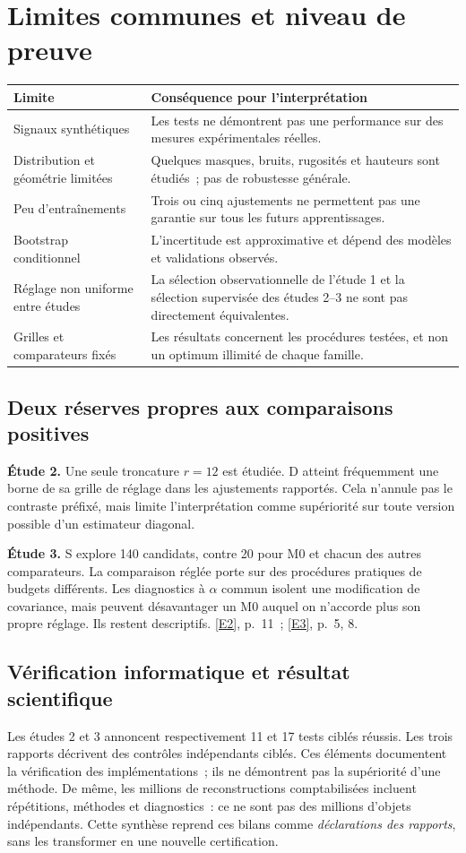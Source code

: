 \documentclass[11pt,a4paper]{article}
\DeclareRobustCommand{\eref}[1]{\hyperlink{ref#1}{[#1]}}
\begin{document}
\newpage
\section{Limites communes et niveau de preuve}
\begin{tabularx}{\textwidth}{@{}p{}Y@{}}
\toprule
\textbf{Limite} & \textbf{Conséquence pour l'interprétation}\\
\midrule
Signaux synthétiques & Les tests ne démontrent pas une performance sur des mesures expérimentales réelles.\\
\addlinespace
Distribution et géométrie limitées & Quelques masques, bruits, rugosités et hauteurs sont étudiés~; pas de robustesse générale.\\
\addlinespace
Peu d'entraînements & Trois ou cinq ajustements ne permettent pas une garantie sur tous les futurs apprentissages.\\
\addlinespace
Bootstrap conditionnel & L'incertitude est approximative et dépend des modèles et validations observés.\\
\addlinespace
Réglage non uniforme entre études & La sélection observationnelle de l'étude 1 et la sélection supervisée des études 2--3 ne sont pas directement équivalentes.\\
\addlinespace
Grilles et comparateurs fixés & Les résultats concernent les procédures testées, et non un optimum illimité de chaque famille.\\
\bottomrule
\end{tabularx}

\subsection*{Deux réserves propres aux comparaisons positives}
\textbf{Étude 2.} Une seule troncature $r=12$ est étudiée. D atteint fréquemment une borne
de sa grille de réglage dans les ajustements rapportés. Cela n'annule pas le contraste préfixé,
mais limite l'interprétation comme supériorité sur toute version possible d'un estimateur diagonal.

\textbf{Étude 3.} S explore 140 candidats, contre 20 pour M0 et chacun des autres
comparateurs. La comparaison réglée porte sur des procédures pratiques de budgets différents.
Les diagnostics à $\alpha$ commun isolent une modification de covariance, mais peuvent
désavantager un M0 auquel on n'accorde plus son propre réglage. Ils restent descriptifs.
\eref{E2}, p.~11~; \eref{E3}, p.~5, 8.

\subsection*{Vérification informatique et résultat scientifique}
Les études 2 et 3 annoncent respectivement 11 et 17 tests ciblés réussis. Les trois rapports
décrivent des contrôles indépendants ciblés. Ces éléments documentent la vérification des implémentations~; ils ne
démontrent pas la supériorité d'une méthode. De même, les millions de reconstructions
comptabilisées incluent répétitions, méthodes et diagnostics~: ce ne sont pas des millions
d'objets indépendants. Cette synthèse reprend ces bilans comme \emph{déclarations des rapports},
sans les transformer en une nouvelle certification.
\end{document}
